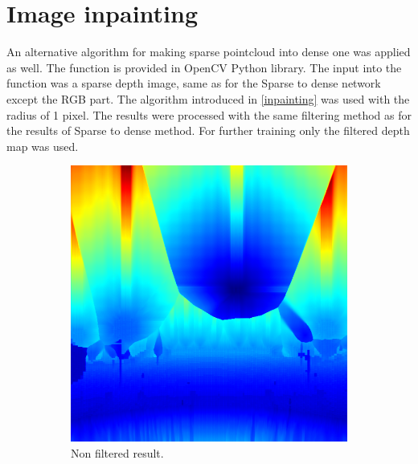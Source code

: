 \documentclass[twoside]{ctuthesis}
\theoremstyle{plain}
\theoremstyle{definition}
\theoremstyle{note}
\begin{document}
\section{Image inpainting}
An alternative algorithm for making sparse pointcloud into dense one was applied as well. The function is provided in OpenCV Python library. The input into the function was a sparse depth image, same as for the Sparse to dense network except the RGB part. The algorithm introduced in \ref{inpainting} was used with the radius of 1 pixel. The results were processed with the same filtering method as for the results of Sparse to dense method. For further training only the filtered depth map was used.
\begin{figure}[h]
	\centering
	\begin{subfigure}[b]{0.3\textwidth}
		\centering
		\includegraphics[width=\textwidth]{raw_inpaint.png}
		\caption{Non filtered result.}
	\end{subfigure}
	\hfill
	\begin{subfigure}[b]{0.3\textwidth}
		\centering

\end{subfigure}
\end{figure}
\end{document}
